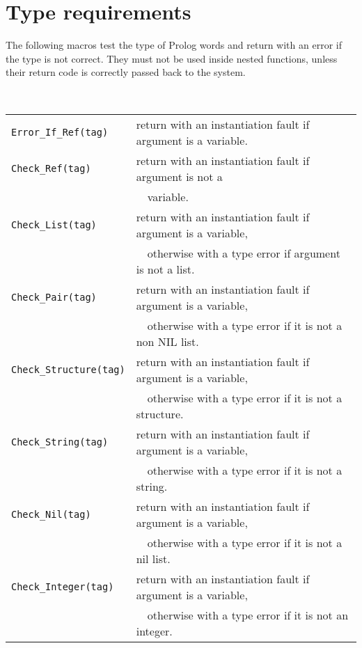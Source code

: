 
\section{Type requirements}
The following macros test the type of Prolog words and return
with an error if the type is not correct.
They must not be used inside nested functions, unless their
return code is correctly passed back to the system.

\noindent
 \\
\begin{tabular}{|ll|} 
\hline
{\tt Error_If_Ref(tag)} & 
return with an instantiation fault if argument is a variable. \\

{\tt Check_Ref(tag)} & 
return with an instantiation fault if argument is not a \\
& \ \ variable. \\

{\tt Check_List(tag)} & 
return with an instantiation fault if argument is a variable, \\
& \ \ otherwise with a type error if argument is not a list. \\

{\tt Check_Pair(tag)} & 
return with an instantiation fault if argument is a variable, \\
& \ \ otherwise with a type error if it is not a non NIL list. \\

{\tt Check_Structure(tag)} & 
return with an instantiation fault if argument is a variable, \\
& \ \ otherwise with a type error if it is not a structure. \\

{\tt Check_String(tag)} & 
return with an instantiation fault if argument is a variable, \\
& \ \ otherwise with a type error if it is not a string. \\

{\tt Check_Nil(tag)} & 
return with an instantiation fault if argument is a variable, \\
& \ \ otherwise with a type error if it is not a nil list. \\

{\tt Check_Integer(tag)} & 
return with an instantiation fault if argument is a variable, \\
& \ \ otherwise with a type error if it is not an integer. \\


\end{tabular}
